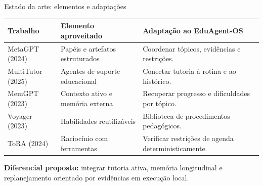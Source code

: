 \documentclass[aspectratio=169,11pt]{beamer}
\begin{document}
\begin{frame}{Estado da arte: elementos e adaptações}
  \small
  \renewcommand{\arraystretch}{1.05}
  \begin{tabular}{@{}p{2.65cm}p{4.25cm}p{6.25cm}@{}}
    \toprule
    \textbf{Trabalho} & \textbf{Elemento aproveitado} & \textbf{Adaptação ao EduAgent-OS}\\
    \midrule
    MetaGPT (2024) & Papéis e artefatos estruturados & Coordenar tópicos, evidências e restrições.\\
    MultiTutor (2025) & Agentes de suporte educacional & Conectar tutoria à rotina e ao histórico.\\
    MemGPT (2023) & Contexto ativo e memória externa & Recuperar progresso e dificuldades por tópico.\\
    Voyager (2023) & Habilidades reutilizáveis & Biblioteca de procedimentos pedagógicos.\\
    ToRA (2024) & Raciocínio com ferramentas & Verificar restrições de agenda deterministicamente.\\
    \bottomrule
  \end{tabular}
  \vspace{3mm}
  \textbf{Diferencial proposto:} integrar tutoria ativa, memória longitudinal
  e replanejamento orientado por evidências em execução local.
\end{frame}
\end{document}
